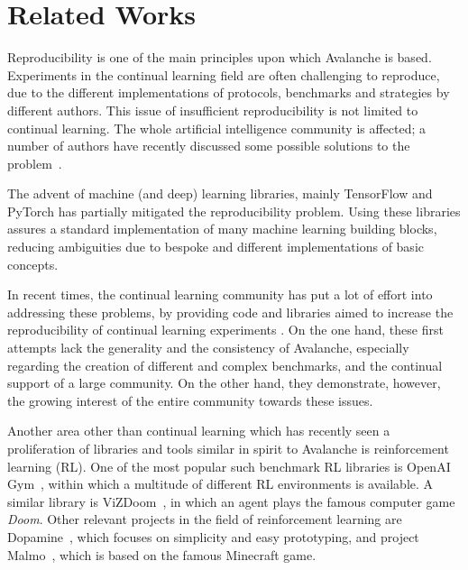 \documentclass[final]{cvpr}
\theoremstyle{definition}
\begin{document}
\section{Related Works}
\label{sec:related}

Reproducibility is one of the main principles upon which Avalanche is based. Experiments in the continual learning field are often challenging to reproduce, due to the different implementations of protocols, benchmarks and strategies by different authors. This issue of insufficient reproducibility is not limited to continual learning. The whole artificial intelligence community is affected; a number of authors have recently discussed some possible solutions to the problem~\cite{dToolAI-rep, Pineau2020ImprovingRI, a_step_towards_repro}.

The advent of machine (and deep) learning libraries, mainly TensorFlow \cite{tensorflow2015-whitepaper} and PyTorch \cite{paszke2019pytorch} has partially mitigated the reproducibility problem.
Using these libraries assures a standard implementation of many machine learning building blocks, reducing ambiguities due to bespoke and different implementations of basic concepts. 

In recent times, the continual learning community has put a lot of effort into addressing these problems, by providing code and libraries aimed to increase the reproducibility of continual learning experiments \cite{delange2021continual, cl_benchmarks, masana2020class, pmlr-v80-serra18a-hat, vandeven2018generative, vandeven2018a}. On the one hand, these first attempts lack the generality and the consistency of Avalanche, especially regarding the creation of different and complex benchmarks, and the continual support of a large community. On the other hand, they demonstrate, however, the growing interest of the entire community towards these issues.

Another area other than continual learning which has recently seen a proliferation of libraries and tools similar in spirit to Avalanche is reinforcement learning (RL). One of the most popular such benchmark RL libraries is OpenAI Gym~\cite{openAI-gym}, within which a multitude of different RL environments is available. A similar library is ViZDoom~\cite{wydmuch2018vizdoom}, in which an agent plays the famous computer game \emph{Doom}. Other relevant projects in the field of reinforcement learning are Dopamine~\cite{castro18dopamine}, which focuses on simplicity and easy prototyping, and project Malmo~\cite{malmo}, which is based on the famous Minecraft game. 
\end{document}
